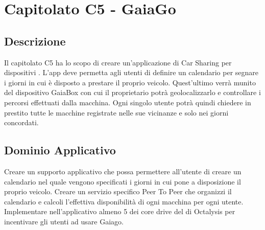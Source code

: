 \clearpage
\section{Capitolato C5 - GaiaGo}
\label{sec:c5}
\subsection{Descrizione}
Il capitolato C5 ha lo scopo di creare un'applicazione di Car Sharing per dispositivi . L'app deve permetta agli utenti di definire un calendario per segnare i giorni in cui è disposto a prestare il proprio veicolo. Quest'ultimo verrà munito del dispositivo GaiaBox con cui il proprietario potrà geolocalizzarlo e controllare i percorsi effettuati dalla macchina. Ogni singolo utente potrà quindi chiedere in prestito tutte le macchine registrate nelle sue vicinanze e solo nei giorni concordati.

\subsection{Dominio Applicativo}
Creare un supporto applicativo che possa permettere all'utente di creare un calendario nel quale vengono specificati i giorni in cui pone a disposizione il proprio veicolo.
Creare un servizio specifico Peer To Peer che organizzi il calendario e calcoli l'effettiva disponibilità di ogni macchina per ogni utente.
Implementare nell'applicativo almeno 5 dei core drive del  di Octalysis per incentivare gli utenti ad usare Gaiago.

